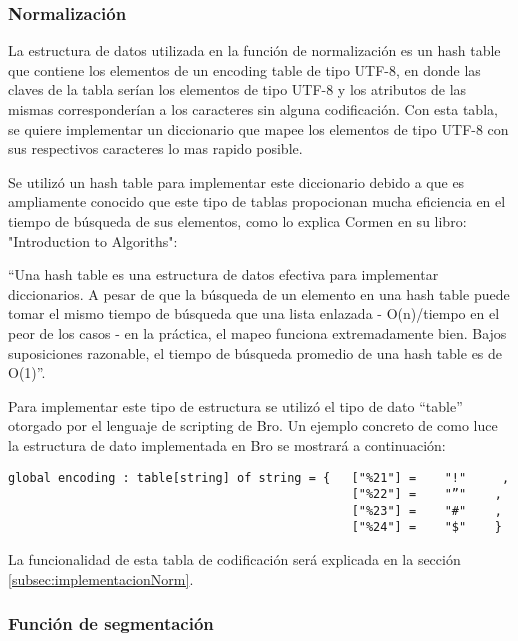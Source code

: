 \subsubsection{Normalización}
\label{sssec:estructuraNormalizacion}

La estructura de datos utilizada en la función de normalización es un hash table que contiene los elementos de un encoding table de tipo UTF-8, en donde las claves de la tabla serían los elementos de tipo UTF-8 y los atributos de las mismas corresponderían a los caracteres sin alguna codificación. Con esta tabla, se quiere implementar un diccionario que mapee los elementos de tipo UTF-8 con sus respectivos caracteres lo mas rapido posible.

Se utilizó un hash table para implementar este diccionario debido a que es ampliamente conocido que este tipo de tablas propocionan mucha eficiencia en el tiempo de búsqueda de sus elementos, como lo explica Cormen en su libro: "Introduction to Algoriths":

“Una hash table es una estructura de datos efectiva para implementar diccionarios. A pesar de que la búsqueda de un elemento en una hash table puede tomar el mismo tiempo de búsqueda que una lista enlazada - O(n)/tiempo en el peor de los casos - en la práctica, el mapeo funciona extremadamente bien.  Bajos suposiciones razonable, el tiempo de búsqueda promedio de una hash table es de O(1)”.

Para implementar este tipo de estructura se utilizó el tipo de dato “table” otorgado por el lenguaje de scripting de Bro. Un ejemplo concreto de como luce la estructura de dato implementada en Bro se mostrará a continuación:

\begin{verbatim}
global encoding : table[string] of string = {   ["%21"] =    "!"     ,
                                                ["%22"] =    "”"    ,                                        
                                                ["%23"] =    "#"    ,
                                                ["%24"] =    "$"    }
\end{verbatim}

La funcionalidad de esta tabla de codificación será explicada en la sección \ref{subsec:implementacionNorm}.

\subsubsection{Función de segmentación}
\label{sssec:estructuraSegmentacion}

